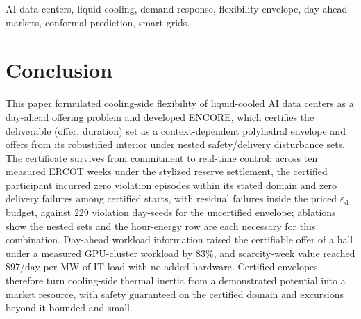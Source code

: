 \documentclass[journal]{IEEEtran}
\newcommand{\epsd}{\varepsilon_{\mathrm{d}}}
\begin{document}
\begin{IEEEkeywords}
AI data centers, liquid cooling, demand response, flexibility envelope,
day-ahead markets, conformal prediction, smart grids.
\end{IEEEkeywords}






\section{Conclusion}
\label{sec:conclusion}
This paper formulated cooling-side flexibility of liquid-cooled AI data
centers as a day-ahead offering problem and developed ENCORE, which certifies
the deliverable (offer, duration) set as a context-dependent polyhedral
envelope and offers from its robustified interior under nested
safety/delivery disturbance sets. The certificate survives from commitment to
real-time control: across ten measured ERCOT weeks under the stylized
reserve settlement, the certified participant incurred zero violation
episodes within its stated domain and zero delivery failures among
certified starts, with residual failures inside the priced $\epsd$ budget,
against $229$ violation day-seeds for the uncertified envelope; ablations
show the nested sets and the hour-energy row are each necessary for this
combination. Day-ahead workload
information raised the certifiable offer of a hall under a measured
GPU-cluster workload by $83\%$, and scarcity-week value reached \$$97$/day
per MW of IT load with no added hardware. Certified envelopes therefore turn
cooling-side thermal inertia from a demonstrated potential into a market
resource, with safety guaranteed on the certified domain and excursions
beyond it bounded and small.



\end{document}
